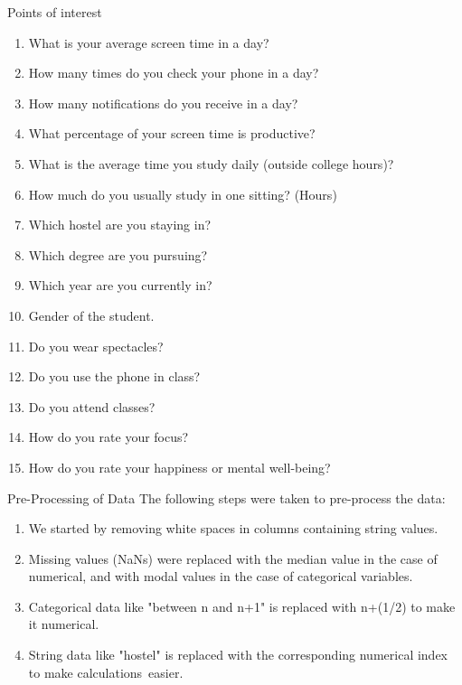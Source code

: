 \documentclass{beamer}
\begin{document}
\begin{frame}
\begin{block}{Points of interest}
\begin{enumerate}
\item What is your average screen time in a day?
\item How many times do you check your phone in a day?
\item How many notifications do you receive in a day?
\item What percentage of your screen time is productive?
\item What is the average time you study daily (outside college hours)?
\item How much do you usually study in one sitting? (Hours)
\item Which hostel are you staying in?
\item Which degree are you pursuing?	
\item Which year are you currently in?	
\item Gender of the student.	
\item Do you wear spectacles?	
\item Do you use the phone in class?	
\item Do you attend classes?	
\item How do you rate your focus?	
\item How do you rate your happiness or mental well-being?
\end{enumerate}
\end{block}
\end{frame}


\begin{frame}
\begin{block}{Pre-Processing of Data}
The following steps were taken to pre-process the data:
\begin{enumerate}
\item We started by removing white spaces in columns containing string values.
\item Missing values (NaNs) were replaced with the median value in the case of numerical, and with modal values in the case of categorical variables.
\item Categorical data like "between n and n+1" is replaced with n+(1/2) to make it numerical.
\item String data like "hostel" is replaced with the corresponding numerical index to make calculations easier.
\end{enumerate}
\end{block}
    
\end{frame}
\end{document}
